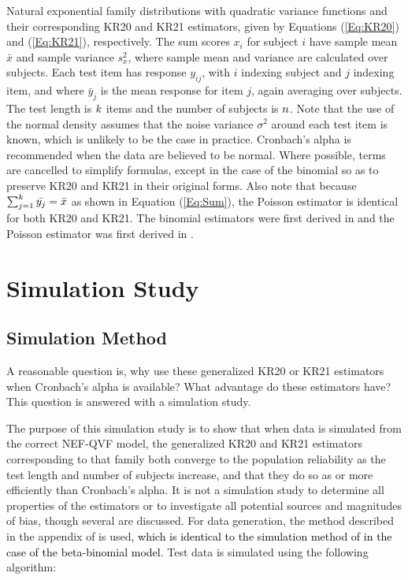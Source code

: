 \documentclass[12pt,epsfig]{article}
\newcommand{\changed}[1]{\textcolor{black}{#1}}
\newcommand{\numsubjects}{\changed{n}}%
\newcommand{\testlength}{\changed{k}}%
\begin{document}
\begin{table}[h]
\caption{Natural exponential family distributions with quadratic variance functions and their corresponding KR20 and KR21 estimators, given by Equations (\ref{Eq:KR20}) and (\ref{Eq:KR21}), respectively. The sum scores $x_i$ for subject $i$ have sample mean $\bar{x}$ and sample variance $s^2_x$, where sample mean and variance are calculated over subjects. Each test item has response $y_{ij}$, with $i$ indexing subject and $j$ indexing item, and where $\bar{y}_j$ is the mean response for item $j$, again averaging over subjects. The test length is $\testlength$ items and the number of subjects is $\numsubjects$. Note that the use of the normal density assumes that the noise variance $\sigma^2$ around each test item is known, which is unlikely to be the case in practice. Cronbach's alpha is recommended when the data are believed to be normal. Where possible, terms are cancelled to simplify formulas, except in the case of the binomial so as to preserve KR20 and KR21 in their original forms. Also note that because $ \sum_{j = 1}^{\testlength} \bar{y_j} = \bar{x}$ as shown in Equation (\ref{Eq:Sum}), the Poisson estimator is identical for both KR20 and KR21. The binomial estimators were first derived in \cite{Kuder1937} and the Poisson estimator was first derived in \cite{Allison1978}. }
\label{Tab:Estimators}
\end{table}





\section{Simulation Study}
\label{Sec:Simulations}

\subsection{Simulation Method}
\label{Subsec:SimulationMethod}

A reasonable question is, why use these generalized KR20 or KR21 estimators when Cronbach's alpha is available?  What advantage do these estimators have? This question is answered with a simulation study.  

The purpose of this simulation study is to show that when data is simulated from the correct NEF-QVF model, the generalized KR20 and KR21 estimators corresponding to that family  both converge to the population reliability as the test length and number of subjects increase, and that they do so as or more efficiently than Cronbach's alpha. It is not a simulation study to determine all properties of the estimators or to investigate all potential sources and magnitudes of bias, though several are discussed.  For data generation, the method described in the appendix of \cite{Foster2020} is used\changed{, which is identical to the simulation method of \cite{Huynh1979} in the case of the beta-binomial model}. Test data is simulated using the following algorithm:
\end{document}
